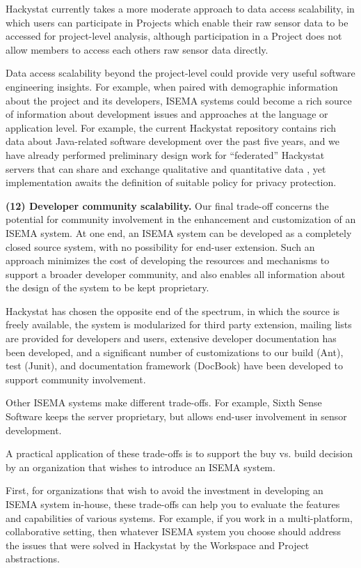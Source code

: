 \documentclass[10pt,twocolumn]{article}
\begin{document}
Hackystat currently takes a more moderate approach to data access
scalability, in which users can participate in Projects which enable their
raw sensor data to be accessed for project-level analysis, although
participation in a Project does not allow members to access each others raw
sensor data directly.

Data access scalability beyond the project-level could provide very useful 
software engineering insights. For example, when paired with demographic information
about the project and its developers, ISEMA systems could become a rich source 
of information about development issues and approaches at the language or
application level.  For example, the current Hackystat repository contains rich 
data about Java-related software development over the past five years, and we 
have already performed preliminary design work for ``federated'' Hackystat servers 
that can share and exchange qualitative and quantitative data \cite{csdl2-05-02}, 
yet implementation awaits the definition of suitable policy for privacy protection. 


{\bf (12) Developer community scalability.} Our final trade-off concerns
the potential for community involvement in the enhancement and
customization of an ISEMA system.  At one end, an ISEMA system can be
developed as a completely closed source system, with no possibility for
end-user extension.  Such an approach minimizes the cost of developing the
resources and mechanisms to support a broader developer community, and also
enables all information about the design of the system to be kept
proprietary.

Hackystat has chosen the opposite end of the spectrum, in which the source
is freely available, the system is modularized for third party extension,
mailing lists are provided for developers and users, extensive developer
documentation has been developed, and a significant number of
customizations to our build (Ant), test (Junit), and documentation
framework (DocBook) have been developed to support community involvement.

Other ISEMA systems make different trade-offs. For example, Sixth Sense
Software keeps the server proprietary, but allows end-user involvement in
sensor development.


A practical application of these trade-offs is to support the buy
vs. build decision by an organization that wishes to introduce an ISEMA
system.

First, for organizations that wish to avoid the investment in developing an
ISEMA system in-house, these trade-offs can help you to evaluate the
features and capabilities of various systems.  For example, if you work in
a multi-platform, collaborative setting, then whatever ISEMA system you
choose should address the issues that were solved in Hackystat by the
Workspace and Project abstractions.
\end{document}
